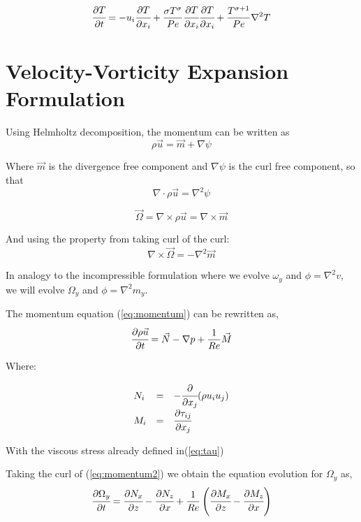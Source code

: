 \documentclass[titlepage,11pt]{article}
\newcommand\ppt[1]{\cfrac{\partial#1}{\partial t}} %
\newcommand\ppx[1]{\cfrac{\partial#1}{\partial x}} %
\newcommand\ppz[1]{\cfrac{\partial#1}{\partial z}} %
\newcommand\ppi[1]{\cfrac{\partial#1}{\partial x_i}} %
\newcommand\ppj[1]{\cfrac{\partial#1}{\partial x_j}} %
\begin{document}
\begin{equation}
	\ppt{T}=-u_i \ppi{T}+\frac{\sigma T^{\sigma}}{Pe}\ppi{T} \ppi{T}+ \frac{T^{\sigma+1}}{Pe} \nabla^2{T}
	\label{eq:energy3}
\end{equation}

\section{Velocity-Vorticity Expansion Formulation}

Using Helmholtz decomposition, the momentum can be written as
\begin{equation}
\rho \vec{u}= \vec{m}+\nabla{\psi}
\label{eq:helmholtz}
\end{equation}

Where $\vec{m}$ is the divergence free component and $\nabla \psi$ is the curl free component, so that
\begin{equation}
\nabla \cdot \rho \vec{u}=\nabla^2 \psi
\end{equation}

\begin{equation}
\vec{\Omega} = \nabla \times \rho \vec{u}=\nabla \times \vec{m} 
\end{equation}

And using the property from taking curl of the curl:
\begin{equation}
\nabla \times \vec{\Omega} = -\nabla^2 \vec{m}
\end{equation}

In analogy to the incompressible formulation where we evolve $\omega_y$ and $\phi=\nabla^2 v$, we will evolve $\Omega_y$ and $\phi=\nabla^2 m_y$.

The momentum equation (\ref{eq:momentum}) can be rewritten as,
\begin{equation}
\ppt{\rho \vec{u}}=\vec{N}-\nabla p + \frac{1}{Re}\vec{M}
\label{eq:momentum2}
\end{equation}

Where:

\begin{equation}
	\begin{array}{lcl}
		N_i &=&-\ppj{}(\rho u_i u_j) \\
		M_i &=& \ppj{\tau_{ij}} 
	\end{array}
\end{equation}


With the viscous stress already defined in(\ref{eq:tau})

Taking the curl of (\ref{eq:momentum2}) we obtain the equation evolution for $\Omega_y$ as, 
\begin{equation}
\ppt{\Omega_y}=\ppz{N_x}-\ppx{N_z}+\frac{1}{Re}\left( \ppz{M_x}-\ppx{M_z} \right)
\label{eq:omegay}
\end{equation}
\end{document}
